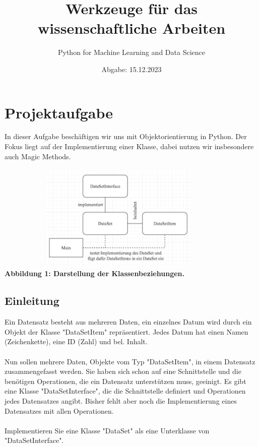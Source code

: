 \documentclass[12pt]{article}
\title{Werkzeuge für das wissenschaftliche Arbeiten}
\date{Abgabe: 15.12.2023}
\author{Python for Machine Learning and Data Science}
\begin{document}
\maketitle
\tableofcontents

\section{Projektaufgabe}
In dieser Aufgabe beschäftigen wir uns mit Objektorientierung in Python.
Der Fokus liegt auf der Implementierung einer Klasse, dabei nutzen wir insbesondere auch Magic Methods.\\
\\
\hspace*{2cm}\includegraphics[width=12cm, height=5cm]{./../diagram/classes_files.png}\\
\hspace*{3cm}\scriptsize\bf Abbildung 1: \normalfont Darstellung der Klassenbeziehungen.\normalsize\\
\subsection{Einleitung}
Ein Datensatz besteht aus mehreren Daten, ein einzelnes Datum wird durch ein Objekt der Klasse "DataSetItem" repräsentiert.
Jedes Datum hat einen Namen (Zeichenkette), eine ID (Zahl) und bel. Inhalt.\\
\\
Nun sollen mehrere Daten, Objekte vom Typ "DataSetItem", in einem Datensatz zusammengefasst werden.
Sie haben sich schon auf eine Schnittstelle und die benötigen Operationen, die ein Datensatz unterstützen muss, geeinigt.
Es gibt eine Klasse "DataSetInterface", die die Schnittstelle definiert und Operationen jedes Datensatzes angibt.
Bisher fehlt aber noch die Implementierung eines Datensatzes mit allen Operationen.\\
\\
Implementieren Sie eine Klasse "DataSet" als eine Unterklasse von "DataSetInterface".\\
\\
\end{document}
